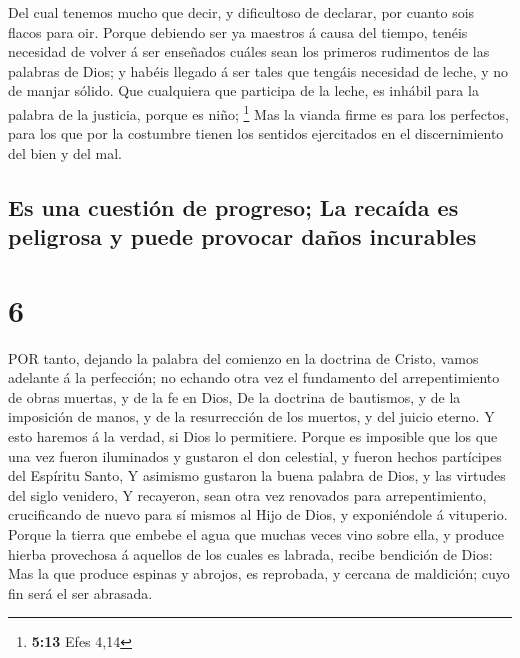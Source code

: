  Del cual tenemos mucho que decir, y dificultoso de
declarar, por cuanto sois flacos para oir.  Porque debiendo
ser ya maestros á causa del tiempo, tenéis necesidad de volver á ser
enseñados cuáles sean los primeros rudimentos de las palabras de Dios; y
habéis llegado á ser tales que tengáis necesidad de leche, y no de
manjar sólido.  Que cualquiera que participa de la leche,
es inhábil para la palabra de la justicia, porque es niño; \footnote{\textbf{5:13}
  Efes 4,14}  Mas la vianda firme es para los perfectos,
para los que por la costumbre tienen los sentidos ejercitados en el
discernimiento del bien y del mal.

\hypertarget{es-una-cuestiuxf3n-de-progreso-la-recauxedda-es-peligrosa-y-puede-provocar-dauxf1os-incurables}{%
\subsection{Es una cuestión de progreso; La recaída es peligrosa y puede
provocar daños
incurables}\label{es-una-cuestiuxf3n-de-progreso-la-recauxedda-es-peligrosa-y-puede-provocar-dauxf1os-incurables}}

\hypertarget{section-5}{%
\section{6}\label{section-5}}

 POR tanto, dejando la palabra del comienzo en la doctrina
de Cristo, vamos adelante á la perfección; no echando otra vez el
fundamento del arrepentimiento de obras muertas, y de la fe en Dios,
 De la doctrina de bautismos, y de la imposición de manos, y
de la resurrección de los muertos, y del juicio eterno.  Y
esto haremos á la verdad, si Dios lo permitiere.  Porque es
imposible que los que una vez fueron iluminados y gustaron el don
celestial, y fueron hechos partícipes del Espíritu Santo,  Y
asimismo gustaron la buena palabra de Dios, y las virtudes del siglo
venidero,  Y recayeron, sean otra vez renovados para
arrepentimiento, crucificando de nuevo para sí mismos al Hijo de Dios, y
exponiéndole á vituperio.  Porque la tierra que embebe el
agua que muchas veces vino sobre ella, y produce hierba provechosa á
aquellos de los cuales es labrada, recibe bendición de Dios:
 Mas la que produce espinas y abrojos, es reprobada, y
cercana de maldición; cuyo fin será el ser abrasada.

